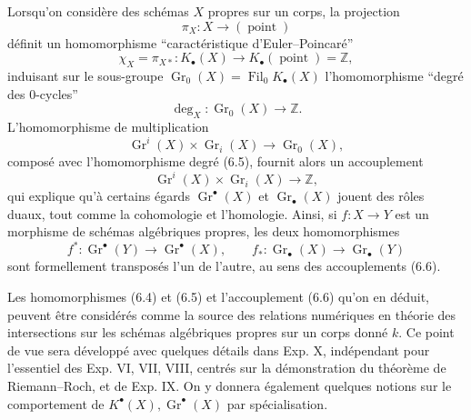 \documentclass[11pt]{article}
\newcommand{\Gr}{\operatorname{Gr}}
\newcommand{\Fil}{\operatorname{Fil}}
\providecommand{\Gr}{\operatorname{Gr}}
\providecommand{\Gr}{\operatorname{G}}
\begin{document}
Lorsqu'on consid\`ere des sch\'emas $X$ propres sur un corps, la projection
\[
\pi_X:X\longrightarrow(\operatorname{point})
\]
d\'efinit un homomorphisme ``caract\'eristique d'Euler--Poincar\'e''
\begin{equation}\tag{6.4}
\chi_X=\pi_{X*}:K_\bullet(X)\longrightarrow K_\bullet(\operatorname{point})=\mathbb Z,
\end{equation}
induisant sur le sous-groupe $\Gr_0(X)=\Fil_0K_\bullet(X)$ l'homomorphisme ``degr\'e des $0$-cycles''
\begin{equation}\tag{6.5}
\deg_X:\Gr_0(X)\longrightarrow \mathbb Z.
\end{equation}
L'homomorphisme de multiplication
\[
\Gr^i(X)\times\Gr_i(X)\longrightarrow \Gr_0(X),
\]
compos\'e avec l'homomorphisme degr\'e (6.5), fournit alors un accouplement
\begin{equation}\tag{6.6}
\Gr^i(X)\times \Gr_i(X)\longrightarrow \mathbb Z,
\end{equation}
qui explique qu'\`a certains \'egards $\Gr^\bullet(X)$ et $\Gr_\bullet(X)$ jouent des r\^oles duaux, tout comme la cohomologie et l'homologie. Ainsi, si $f:X\to Y$ est un morphisme de sch\'emas alg\'ebriques propres, les deux homomorphismes
\[
f^*:\Gr^\bullet(Y)\longrightarrow \Gr^\bullet(X),\qquad f_*:\Gr_\bullet(X)\longrightarrow \Gr_\bullet(Y)
\]
sont formellement transpos\'es l'un de l'autre, au sens des accouplements (6.6).

Les homomorphismes (6.4) et (6.5) et l'accouplement (6.6) qu'on en d\'eduit, peuvent \^etre consid\'er\'es comme la source des relations num\'eriques en th\'eorie des intersections sur les sch\'emas alg\'ebriques propres sur un corps donn\'e $k$. Ce point de vue sera d\'evelopp\'e avec quelques d\'etails dans Exp. X, ind\'ependant pour l'essentiel des Exp. VI, VII, VIII, centr\'es sur la d\'emonstration du th\'eor\`eme de Riemann--Roch, et de Exp. IX. On y donnera \'egalement quelques notions sur le comportement de $K^\bullet(X),\Gr^\bullet(X)$ par sp\'ecialisation.
\end{document}
